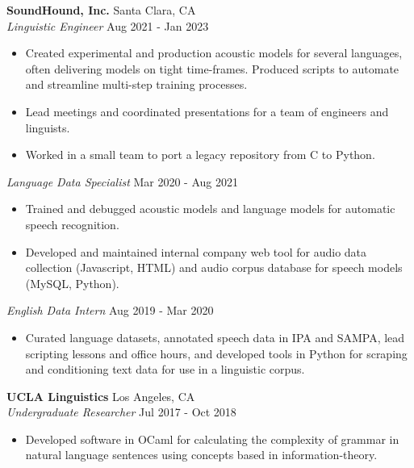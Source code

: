 \documentclass[]{article}
\begin{document}
	\textbf{SoundHound, Inc.} \hfill Santa Clara, CA\\
	\textit{Linguistic Engineer} \hfill Aug 2021 - Jan 2023\\
	\vspace{-3mm}
	\begin{itemize} \itemsep 0pt
		\item Created experimental and production acoustic models for several languages, often delivering models on tight time-frames.  Produced scripts to automate and streamline multi-step training processes.
		\item Lead meetings and coordinated presentations for a team of engineers and linguists.
		\item Worked in a small team to port a legacy repository from C to Python. 
	\end{itemize}
	\textit{Language Data Specialist} \hfill Mar 2020 - Aug 2021\\
	\vspace{-3mm}
	\begin{itemize} \itemsep 0pt
		\item Trained and debugged acoustic models and language models for automatic speech recognition.  
		\item Developed and maintained internal company web tool for audio data collection (Javascript, HTML) and audio corpus database for speech models (MySQL, Python).
	\end{itemize}
	\textit{English Data Intern} \hfill Aug 2019 - Mar 2020\\
	\vspace{-3mm}
	\begin{itemize} \itemsep 0pt
		\item Curated language datasets, annotated speech data in IPA and SAMPA, lead scripting lessons and office hours, and developed tools in Python for scraping and conditioning text data for use in a linguistic corpus.
	\end{itemize}
	\vspace{1mm}
	
	\textbf{UCLA Linguistics} \hfill Los Angeles, CA\\
	\textit{Undergraduate Researcher} \hfill Jul 2017 - Oct 2018\\
	\vspace{-3mm}
	\begin{itemize} \itemsep 0pt
		\item Developed software in OCaml for calculating the complexity of grammar in natural language sentences using concepts based in information-theory.
	\end{itemize}
	
\end{document}
